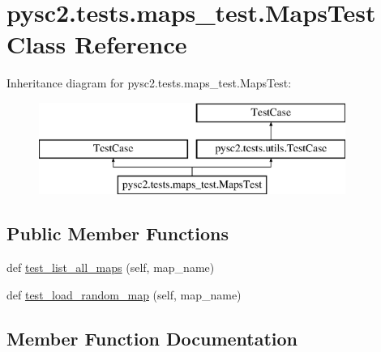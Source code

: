 \hypertarget{classpysc2_1_1tests_1_1maps__test_1_1_maps_test}{}\section{pysc2.\+tests.\+maps\+\_\+test.\+Maps\+Test Class Reference}
\label{classpysc2_1_1tests_1_1maps__test_1_1_maps_test}
Inheritance diagram for pysc2.\+tests.\+maps\+\_\+test.\+Maps\+Test\+:\begin{figure}[H]
\begin{center}
\leavevmode
\includegraphics[height=3.000000cm]{classpysc2_1_1tests_1_1maps__test_1_1_maps_test}
\end{center}
\end{figure}
\subsection*{Public Member Functions}
\begin{DoxyCompactItemize}
\item 
def \mbox{\hyperlink{classpysc2_1_1tests_1_1maps__test_1_1_maps_test_addff2e84120f337d9eaa10895353b5b1}{test\+\_\+list\+\_\+all\+\_\+maps}} (self, map\+\_\+name)
\item 
def \mbox{\hyperlink{classpysc2_1_1tests_1_1maps__test_1_1_maps_test_ad1333103de04d377f36eebf9f18885a0}{test\+\_\+load\+\_\+random\+\_\+map}} (self, map\+\_\+name)
\end{DoxyCompactItemize}


\subsection{Member Function Documentation}
\mbox{\label{classpysc2_1_1tests_1_1maps__test_1_1_maps_test_addff2e84120f337d9eaa10895353b5b1}} 
